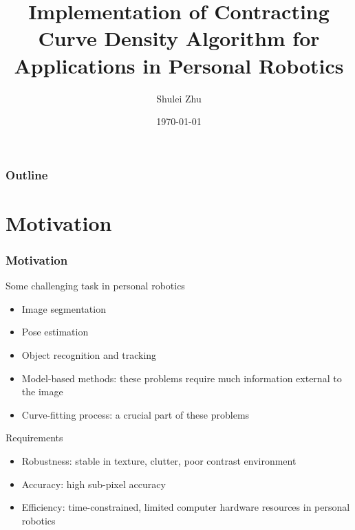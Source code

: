 \documentclass[english,10pt,presentation]{beamer}
\title{Implementation of Contracting Curve Density Algorithm for Applications in Personal Robotics}
\author{Shulei Zhu}
\date{\today}
\begin{document}
\maketitle

\begin{frame}
\frametitle{Outline}
\setcounter{tocdepth}{2}
\tableofcontents
\end{frame}

\section{Motivation}
\label{sec-1}
\begin{frame}
\frametitle{Motivation}
\label{sec-1_1}
\begin{alertblock}{Some challenging task in personal robotics}
\label{sec-1_1_1}
\begin{itemize}

\item Image segmentation\\
\label{sec-1_1_1_1}%
\item Pose estimation\\
\label{sec-1_1_1_2}%
\item Object recognition and tracking\\
\label{sec-1_1_1_3}%
\end{itemize} %
\end{alertblock}
\begin{itemize}

\item Model-based methods: these problems require much information external to the image\\
\label{sec-1_1_2}%
\item Curve-fitting process: a crucial part of these problems\\
\label{sec-1_1_3}%
\end{itemize} %
\begin{exampleblock}{Requirements}
\label{sec-1_1_4}
\begin{itemize}

\item Robustness: stable in texture, clutter, poor contrast environment\\
\label{sec-1_1_4_1}%
\item Accuracy: high sub-pixel accuracy\\
\label{sec-1_1_4_2}%
\item Efficiency: time-constrained, limited computer hardware resources in personal robotics\\
\label{sec-1_1_4_3}%
\end{itemize} %
\end{exampleblock}
\end{frame}
\end{document}
